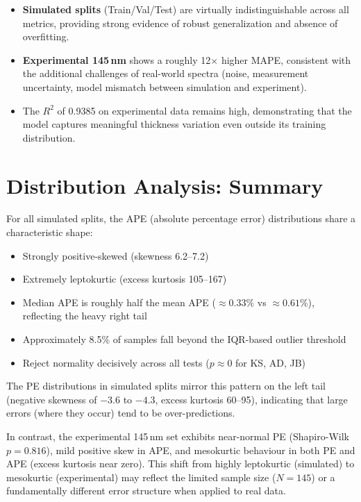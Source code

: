 \documentclass[11pt,a4paper]{article}
\begin{document}
\begin{itemize}
  \item \textbf{Simulated splits} (Train/Val/Test) are virtually indistinguishable across all metrics, providing strong evidence of robust generalization and absence of overfitting.
  \item \textbf{Experimental 145\,nm} shows a roughly 12$\times$ higher MAPE, consistent with the additional challenges of real-world spectra (noise, measurement uncertainty, model mismatch between simulation and experiment).
  \item The $R^2$ of 0.9385 on experimental data remains high, demonstrating that the model captures meaningful thickness variation even outside its training distribution.
\end{itemize}

\section{Distribution Analysis: Summary}

For all simulated splits, the APE (absolute percentage error) distributions share a characteristic shape:

\begin{itemize}
  \item Strongly positive-skewed (skewness 6.2–7.2)
  \item Extremely leptokurtic (excess kurtosis 105–167)
  \item Median APE is roughly half the mean APE ($\approx 0.33\%$ vs $\approx 0.61\%$), reflecting the heavy right tail
  \item Approximately 8.5\% of samples fall beyond the IQR-based outlier threshold
  \item Reject normality decisively across all tests ($p \approx 0$ for KS, AD, JB)
\end{itemize}

The PE distributions in simulated splits mirror this pattern on the left tail (negative skewness of $-3.6$ to $-4.3$, excess kurtosis 60–95), indicating that large errors (where they occur) tend to be over-predictions.

In contrast, the experimental 145\,nm set exhibits near-normal PE (Shapiro-Wilk $p = 0.816$), mild positive skew in APE, and mesokurtic behaviour in both PE and APE (excess kurtosis near zero). This shift from highly leptokurtic (simulated) to mesokurtic (experimental) may reflect the limited sample size ($N = 145$) or a fundamentally different error structure when applied to real data.
\end{document}
